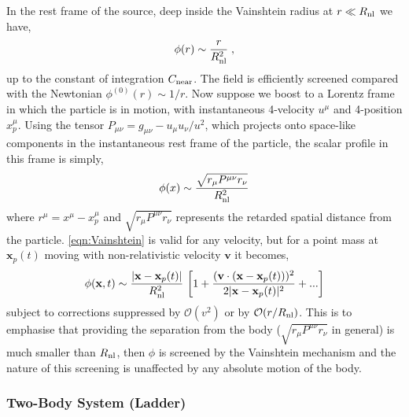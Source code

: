 \documentclass[11pt]{article}
\begin{document}
In the rest frame of the source, deep inside the Vainshtein radius at $r \ll R_{\rm nl}$ we have,
\begin{equation}
 \phi ( r) \sim  \frac{r}{ R_{\rm nl}^2 }  \; , 
\end{equation}
up to the constant of integration $C_{\rm near}$. The field is efficiently screened compared with the Newtonian $\phi^{(0)} (r) \sim 1/r$. 
Now suppose we boost to a Lorentz frame in which the particle is in motion, with instantaneous 4-velocity $u^\mu$ and 4-position $x_p^\mu$. Using the tensor $P_{\mu \nu}  = g_{\mu\nu} - u_\mu u_\nu / u^2$, which projects onto space-like components in the instantaneous rest frame of the particle, the scalar profile in this frame is simply,
\begin{equation}
 \phi ( x ) \sim  \frac{ \sqrt{ r_\mu P^{\mu\nu} r_\nu }  }{R_{\rm nl}^2} 
 \label{eqn:Vainshtein}
\end{equation}
where $r^\mu = x^\mu - x_p^\mu$ and $\sqrt{ r_\mu P^{\mu\nu} r_\nu }$ represents the retarded spatial distance from the particle. \eqref{eqn:Vainshtein} is valid for any velocity,
but for a point mass at $\mathbf{x}_{p} (t)$ moving with non-relativistic velocity $\mathbf{v}$ it becomes,
\begin{equation}
 \phi ( \mathbf{x}, t ) \sim \frac{ | \mathbf{x} - \mathbf{x}_p (t) | }{ R_{\rm nl}^2 }  \, \left[ 1 + \frac{ ( \mathbf{v} \cdot ( \mathbf{x} - \mathbf{x}_p (t) ) )^2  }{2 | \mathbf{x} - \mathbf{x}_p (t) |^2 } + ...    \right] 
 \label{eqn:VainshteinPN}
\end{equation}
subject to corrections suppressed by $\mathcal{O} (v^2)$ 
or by $\mathcal{O} ( r/ R_{\rm nl}  )$.
This is to emphasise that providing the separation from the body ($\sqrt{ r_\mu P^{\mu\nu} r_\nu }$ in general) is much smaller than $R_{\rm nl}$, then $\phi$ is screened by the Vainshtein mechanism and the nature of this screening is unaffected by any absolute motion of the body.  



\subsubsection{Two-Body System (Ladder)}
\label{sec:ladder}

\end{document}
